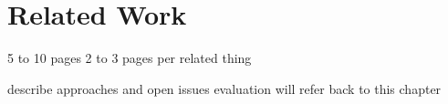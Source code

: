 \chapter{Related Work}


5 to 10 pages
2 to 3 pages per related thing

describe approaches and open issues
evaluation will refer back to this chapter
